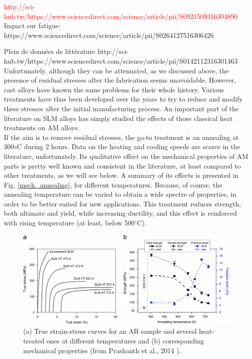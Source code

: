 \textcolor{red}{http://sci-hub.tw/https://www.sciencedirect.com/science/article/pii/S0921509316304890}\\

Impact sur fatigue:
https://www.sciencedirect.com/science/article/pii/S0264127516306426

Plein de données de littérature
http://sci-hub.tw/https://www.sciencedirect.com/science/article/pii/S0142112316301463 \\

Unfortunately, although they can be attenuated, as we discussed above, the presence of residual stresses after the fabrication seems unavoidable. However, cast alloys have known the same problems for their whole history. Various treatments have thus been developed over the years to try to reduce and modify these stresses after the initial manufacturing process. An important part of the literature on SLM alloys has simply studied the effects of those classical heat treatments on AM alloys.\\

If the aim is to remove residual stresses, the go-to treatment is an annealing at 300$\circ$C during 2 hours. Data on the heating and cooling speeds are scarce in the literature, unfortunately. Its qualitative effect on the mechanical properties of AM parts is pretty well known and consistent in the literature, at least compared to other treatments, as we will see below. A summary of its effects is presented in Fig. \ref{mech_annealing}\cite{PRASHANTH14}, for different temperatures. Because, of course, the annealing temperature can be varied to obtain a wide spectre of properties, in order to be better suited for new applications. This treatment reduces strength, both ultimate and yield, while increasing ductility, and this effect is reinforced with rising temperature (at least, below 500$^\circ$C). \\

\begin{figure}[ht]
	\centering
	\includegraphics[scale=0.30]{Images/mech_annealing}
	\decoRule
	\caption[Principal residual stresses as a function of the depth relative to the surface. Sample B is built onto an undefined hollow support, while A is not]{(a) True strain-stress curves for an AB sample and several heat-treated ones at different temperatures and (b) corresponding mechanical properties (from Prashanth et al., 2014 \parencite{PRASHANTH14}).}
	\label{fig:mech_annealing}
\end{figure}

